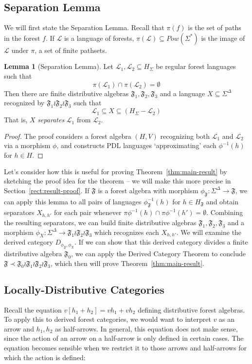 \documentclass[sigplan,9pt]{acmart}\settopmatter{printfolios=true,printccs=false,printacmref=false}
\newcounter{thm}
\newcounter{theorem}
\theoremstyle{definition}
\newtheorem{llemma}[thm]{Lemma}
\newcommand{\La}[0]{{\mathcal{L}}}
\newcommand{\Ff}[0]{{\mathfrak{F}}}
\begin{document}
\subsection{Separation Lemma}
We will first state the Separation Lemma.
Recall that $\pi(f)$ is the set of paths in the forest $f$.
If $\La$ is a language of forests, $\pi(\La) \subseteq Pow(\Sigma^*)$ is the image of $\La$ under $\pi$, a set of finite pathsets.

\begin{llemma}[Separation Lemma]\label{cor:separation}
Let $\La_1, \La_2 \subseteq H_\Sigma$ be regular forest languages such that
$$\pi(\La_1) \cap \pi(\La_2) = \emptyset$$
Then there are finite distributive algebras $\Ff_1, \Ff_2, \Ff_3$ and a language $X \subseteq \Sigma^\Delta$ recognized by $\Ff_1\wr\Ff_2\wr\Ff_3$ such that $$\La_1 \subseteq X \subseteq (H_\Sigma - \La_2)$$
That is, $X$ \emph{separates} $\La_1$ from $\La_2$.
\end{llemma}

\begin{proof}
The proof considers a forest algebra $(H,V)$ recognizing both $\La_1$ and $\La_2$ via a morphism $\phi$, and constructs PDL languages `approximating' each $\phi^{-1}(h)$ for $h \in H$.
\end{proof}

Let's consider how this is useful for proving Theorem~\ref{thm:main-result} by sketching the proof idea for the theorem -- we will make this more precise in Section~\ref{rect:result-proof}.
If $\Ff$ is a forest algebra with morphism $\phi_\Ff : \Sigma^\Delta \rightarrow \Ff$, we can apply this lemma to all pairs of languages $\phi_\Ff^{-1}(h)$ for $h \in H_\Ff$ and obtain separators $X_{h,h'}$ for each pair whenever $\pi\phi^{-1}(h)\cap\pi\phi^{-1}(h') = \emptyset$.
Combining the resulting separators, we can build finite distributive algebras $\Ff_1, \Ff_2, \Ff_3$ and a morphism $\phi_X : \Sigma^\Delta \rightarrow \Ff_1\wr\Ff_2\wr\Ff_3$ which recognizes each $X_{h,h'}$.
We will examine the derived category $D_{\phi_\Ff, \phi_X}$.
If we can show that this derived category divides a finite distributive algebra $\Ff_0$, we can apply the Derived Category Theorem to conclude $\Ff \prec \Ff_0 \wr \Ff_1 \wr \Ff_2 \wr \Ff_3$, which then will prove Theorem~\ref{thm:main-result}.

\subsection{Locally-Distributive Categories}
Recall the equation $v [h_1 + h_2] = v h_1 + v h_2$ defining distributive forest algebras.
To apply this to derived forest categories, we would want to interpret $v$ as an arrow and $h_1, h_2$ as half-arrows.
In general, this equation does not make sense, since the action of an arrow on a half-arrow is only defined in certain cases. %
The equation becomes sensible when we restrict it to those arrows and half-arrows for which the action is defined:
\end{document}
